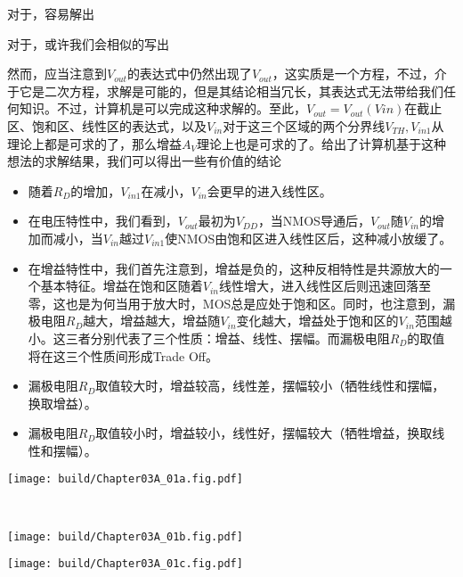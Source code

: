 对于，容易解出
对于，或许我们会相似的写出
然而，应当注意到$V_{out}$的表达式中仍然出现了$V_{out}$，这实质是一个方程，不过，介于它是二次方程，求解是可能的，但是其结论相当冗长，其表达式无法带给我们任何知识。不过，计算机是可以完成这种求解的。至此，$V_{out}=V_{out}(Vin)$在截止区、饱和区、线性区的表达式，以及$V_{in}$对于这三个区域的两个分界线$V_{TH},V_{in1}$从理论上都是可求的了，那么增益$A_V$理论上也是可求的了。给出了计算机基于这种想法的求解结果，我们可以得出一些有价值的结论
\begin{itemize}
    \item 随着$R_{D}$的增加，$V_{in1}$在减小，$V_{in}$会更早的进入线性区。
    \item 在电压特性中，我们看到，$V_{out}$最初为$V_{DD}$，当NMOS导通后，$V_{out}$随$V_{in}$的增加而减小，当$V_{in}$越过$V_{in1}$使NMOS由饱和区进入线性区后，这种减小放缓了。
    \item 在增益特性中，我们首先注意到，增益是负的，这种反相特性是共源放大的一个基本特征。增益在饱和区随着$V_{in}$线性增大，进入线性区后则迅速回落至零，这也是为何当用于放大时，MOS总是应处于饱和区。同时，也注意到，漏极电阻$R_D$越大，增益越大，增益随$V_{in}$变化越大，增益处于饱和区的$V_{in}$范围越小。这三者分别代表了三个性质：增益、线性、摆幅。而漏极电阻$R_{D}$的取值将在这三个性质间形成Trade Off。
    \item 漏极电阻$R_D$取值较大时，增益较高，线性差，摆幅较小（牺牲线性和摆幅，换取增益）。
    \item 漏极电阻$R_D$取值较小时，增益较小，线性好，摆幅较大（牺牲增益，换取线性和摆幅）。
\end{itemize}

\begin{Figure}[采用电阻负载的共源级增益]
    \begin{FigureSub}
        \texttt{[image: build/Chapter03A\_01a.fig.pdf]}
    \end{FigureSub}\\ \vspace{0.5cm}
    \begin{FigureSub}
        \texttt{[image: build/Chapter03A\_01b.fig.pdf]}
    \end{FigureSub}
    \begin{FigureSub}
        \texttt{[image: build/Chapter03A\_01c.fig.pdf]}
    \end{FigureSub}
\end{Figure}

